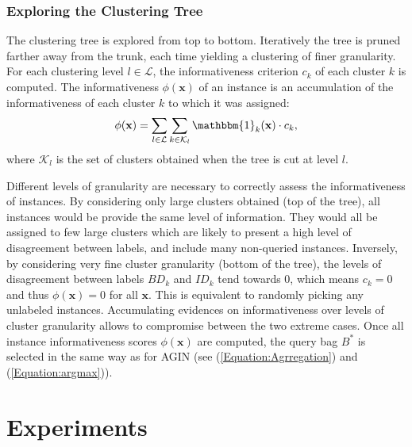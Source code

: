 \documentclass{article}
\begin{document}
\subsubsection*{Exploring the Clustering Tree}
The clustering tree is explored from top to bottom. Iteratively the tree is pruned farther away from the trunk, each time yielding a clustering of finer granularity. For each clustering level $l \in \mathcal{L}$, the informativeness criterion $c_k$ of each cluster $k$ is computed. The informativeness $\phi(\textbf{x})$ of an instance is an accumulation of the informativeness of each cluster $k$ to which it was assigned:
\begin{equation}
\phi (\textbf{x})=\sum_{l \in \mathcal{L}} \sum_{k \in \mathcal{K}_l}  \mathbbm{1}_k (\textbf{x}) \cdot c_k,
\end{equation}  
where $\mathcal{K}_l$ is the set of clusters obtained when the tree is cut at level $l$. 

Different levels of granularity are necessary to correctly assess the informativeness of instances. By considering only large clusters obtained (top of the tree), all instances would be provide the same level of information. They would all be assigned to few large clusters which are likely to present a high level of disagreement between labels, and include many non-queried instances. Inversely, by considering very fine cluster granularity (bottom of the tree), the levels of disagreement between labels $BD_k$ and $ID_k$ tend towards 0, which means $c_k = 0$ and thus $\phi (\textbf{x})=0$ for all $\textbf{x}$. This is equivalent to randomly picking any unlabeled instances. Accumulating evidences on informativeness over levels of cluster granularity allows to compromise between the two extreme cases. Once all instance informativeness scores $\phi(\textbf{x})$ are computed, the query bag $B^*$ is selected in the same way as for AGIN (see (\ref{Equation:Agrregation}) and (\ref{Equation:argmax})).


\section{Experiments}
\label{Section:Experiments}
\end{document}

